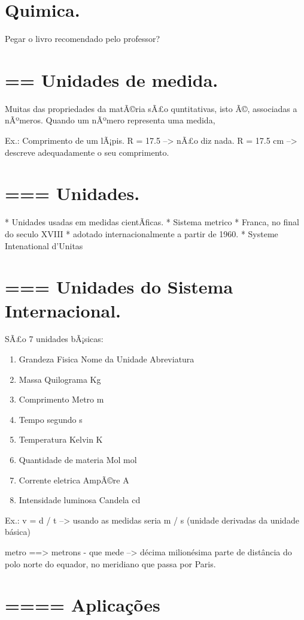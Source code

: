 \documentclass[a4paper,12pt]{article}
\begin{document}
\section{Quimica.}
Pegar o livro recomendado pelo professor?

\section{== Unidades de medida.}
Muitas das propriedades da matÃ©ria sÃ£o quntitativas, isto Ã©, associadas a nÃºmeros. Quando um nÃºmero representa uma medida, 

Ex.: Comprimento de um lÃ¡pis.
R = 17.5 --> nÃ£o diz nada.
R = 17.5 cm --> descreve adequadamente o seu comprimento.

\section{=== Unidades.}
  * Unidades usadas em medidas cientÃ­ficas.
  * Sistema metrico
    * Franca, no final do seculo XVIII
    * adotado internacionalmente a partir de 1960.
    * Systeme Intenational d'Unitas

\section{=== Unidades do Sistema Internacional.}
SÃ£o 7 unidades bÃ¡sicas:

\begin{enumerate}
\item Grandeza Fisica		Nome da Unidade		Abreviatura
\item Massa    			Quilograma		Kg
\item Comprimento		Metro			m
\item Tempo			segundo			s
\item Temperatura		Kelvin			K
\item Quantidade de materia	Mol			mol
\item Corrente eletrica		AmpÃ©re			A
\item Intensidade luminosa	Candela			cd
\end {enumerate}

Ex.:
v = d / t --> usando as medidas seria m / s (unidade derivadas da unidade básica)

metro ==> metrons - que mede --> décima milionésima parte de distância do polo norte do equador, no meridiano que passa por Paris.

\section{==== Aplicações}
\end{document}
